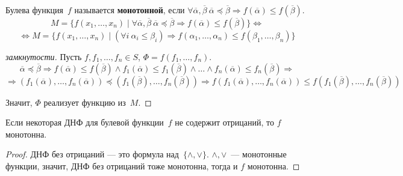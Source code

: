  Булева функция~$f$ называется \textbf{монотонной}, если
$\forall \overline\alpha, \overline\beta \
\overline\alpha \preccurlyeq \overline\beta \Rightarrow f(\overline\alpha) \leqslant f(\overline\beta)$.
\begin{equation*}
M = \{ f(x_1, \ldots, x_n) \mid
\forall \overline\alpha, \overline\beta \
\overline\alpha \preccurlyeq \overline\beta \Rightarrow f(\overline\alpha) \leqslant f(\overline\beta) \} \Leftrightarrow
\end{equation*}
\begin{equation*}
\Leftrightarrow M = \{ f(x_1, \ldots, x_n) \mid
(\forall i \ \alpha_i \leqslant \beta_i) \Rightarrow f(\alpha_1, \ldots, \alpha_n) \leqslant f(\beta_1, \ldots, \beta_n) \}
\end{equation*}
\begin{proof}[замкнутости]
Пусть $f, f_1, \ldots, f_n \in S$, $\Phi = f(f_1, \ldots, f_n)$.
\begin{equation*}
\overline\alpha \preccurlyeq \overline\beta \Rightarrow
f(\overline\alpha) \leqslant f(\overline\beta) \land
f_1(\overline\alpha) \leqslant f_1(\overline\beta) \land \ldots \land
f_n(\overline\alpha) \leqslant f_n(\overline\beta) \Rightarrow
\end{equation*}
\begin{equation*}
\Rightarrow (f_1(\overline\alpha), \ldots, f_n(\overline\alpha)) \preccurlyeq (f_1(\overline\beta), \ldots, f_n(\overline\beta)) \Rightarrow
f(f_1(\overline\alpha), \ldots, f_n(\overline\alpha)) \leqslant f(f_1(\overline\beta), \ldots, f_n(\overline\beta))
\end{equation*}

Значит, $\Phi$ реализует функцию из~$M$.
\end{proof}

\begin{consequent}
Если некоторая ДНФ для булевой функции~$f$ не содержит отрицаний, то $f$ монотонна.
\end{consequent}
\begin{proof}
ДНФ без отрицаний — это формула над~$\{ \land, \lor \}$.
$\land, \lor$~--- монотонные функции, значит, ДНФ без отрицаний тоже монотонна, тогда и $f$ монотонна.
\end{proof}

